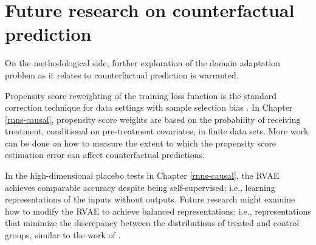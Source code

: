 \section{Future research on counterfactual prediction}

On the methodological side, further exploration of the domain adaptation problem as it relates to counterfactual prediction is warranted. 

Propensity score reweighting of the training loss function is the standard correction technique for data settings with sample selection bias \citep{cortes2008sample}. In Chapter \ref{rnns-causal}, propensity score weights are based on the probability of receiving treatment, conditional on pre-treatment covariates, in finite data sets. More work can be done on how to measure the extent to which the propensity score estimation error can affect counterfactual predictions. 

In the high-dimensional placebo tests in Chapter \ref{rnns-causal}, the RVAE achieves comparable accuracy despite being self-supervised; i.e., learning representations of the inputs without outputs. Future research might examine how to modify the RVAE to achieve balanced representations; i.e., representations that minimize the discrepancy between the distributions of treated and control groups, similar to the work of \citet{johansson2016learning}.


